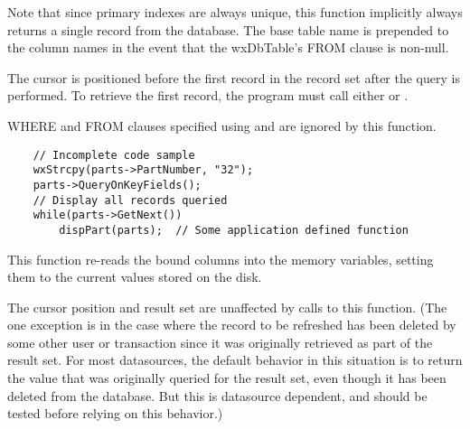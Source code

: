 Note that since primary indexes are always unique, this function implicitly
always returns a single record from the database. The base table name is
prepended to the column names in the event that the wxDbTable's FROM clause
is non-null.




The cursor is positioned before the first record in the record set after
the query is performed.  To retrieve the first record, the program must call
either  or
.

WHERE and FROM clauses specified using 
and  are ignored by
this function.


\begin{verbatim}
    // Incomplete code sample
    wxStrcpy(parts->PartNumber, "32");
    parts->QueryOnKeyFields();
    // Display all records queried
    while(parts->GetNext())
        dispPart(parts);  // Some application defined function
\end{verbatim}

\label{wxdbtablerefresh}


This function re-reads the bound columns into the memory variables, setting
them to the current values stored on the disk.

The cursor position and result set are unaffected by calls to this function.
(The one exception is in the case where the record to be refreshed has been
deleted by some other user or transaction since it was originally retrieved
as part of the result set.  For most datasources, the default behavior in
this situation is to return the value that was originally queried for the
result set, even though it has been deleted from the database.  But this is
datasource dependent, and should be tested before relying on this behavior.)

